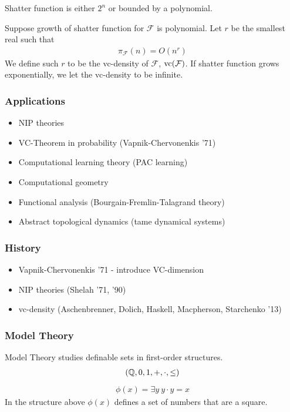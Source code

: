 \documentclass{beamer}
\newcommand{\F}{\mathcal F}
\begin{document}
\begin{frame}
	\begin{Theorem} 
		Shatter function is either $2^n$ or bounded by a polynomial.
	\end{Theorem}
	\begin{Definition}
		Suppose growth of shatter function for $\F$ is polynomial.
		Let $r$ be the smallest real such that 
		\begin{align*}
			\pi_\F(n) = O(n^r)
		\end{align*}
		We define such $r$ to be the vc-density of $\F$, $\vc(\F)$.
		If shatter function grows exponentially, we let the vc-density to be infinite.
	\end{Definition}
\end{frame}

\begin{frame}
	\frametitle{Applications}
	\begin{itemize}
		\item NIP theories
		\item VC-Theorem in probability (Vapnik-Chervonenkis '71)
		\item Computational learning theory (PAC learning)
		\item Computational geometry
		\item Functional analysis (Bourgain-Fremlin-Talagrand theory)
		\item Abstract topological dynamics (tame dynamical systems)
	\end{itemize}
\end{frame}

\begin{frame}
	\frametitle{History}
	\begin{itemize}
		\item Vapnik-Chervonenkis '71 - introduce VC-dimension
		\item NIP theories (Shelah '71, '90)
		\item vc-density (Aschenbrenner, Dolich, Haskell, Macpherson, Starchenko '13)
	\end{itemize}
\end{frame}

\begin{frame}
	\frametitle{Model Theory}
	Model Theory studies definable sets in first-order structures.
	\begin{align*}
		(\mathbb{Q}, 0, 1, +, \cdot, \leq)
	\end{align*}
	\begin{align*}
		\phi(x) = \exists y \ y \cdot y = x
	\end{align*}
	In the structure above $\phi(x)$ defines a set of numbers that are a square.
\end{frame}
\end{document}
